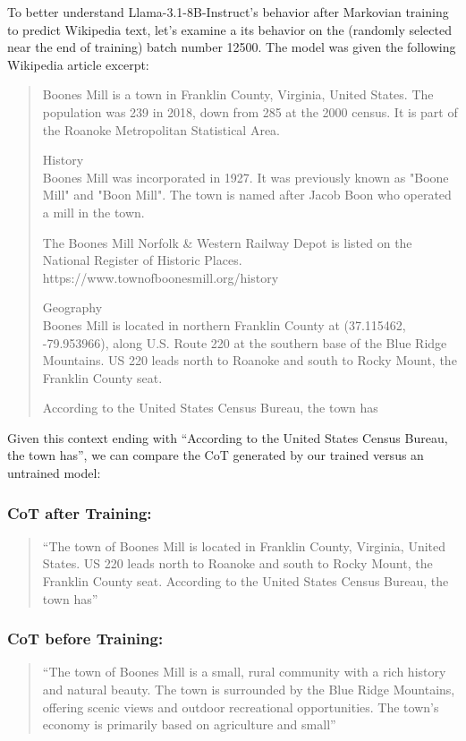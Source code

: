 \documentclass{article}
\begin{document}
To better understand Llama-3.1-8B-Instruct's behavior after Markovian training to predict Wikipedia text, let's examine a its behavior on the (randomly selected near the end of training) batch number 12500. The model was given the following Wikipedia article excerpt:

\begin{quote}
Boones Mill is a town in Franklin County, Virginia, United States. The population was 239 in 2018, down from 285 at the 2000 census. It is part of the Roanoke Metropolitan Statistical Area.

History\\
Boones Mill was incorporated in 1927. It was previously known as "Boone Mill" and "Boon Mill". The town is named after Jacob Boon who operated a mill in the town.

The Boones Mill Norfolk \& Western Railway Depot is listed on the National Register of Historic Places.
https://www.townofboonesmill.org/history

Geography\\
Boones Mill is located in northern Franklin County at  (37.115462, -79.953966), along U.S. Route 220 at the southern base of the Blue Ridge Mountains. US 220 leads north  to Roanoke and south  to Rocky Mount, the Franklin County seat.

According to the United States Census Bureau, the town has
\end{quote}

Given this context ending with ``According to the United States Census Bureau, the town has'', we can compare the CoT generated by our trained versus an untrained model:

\subsubsection{CoT after Training:}
\begin{quote}
``The town of Boones Mill is located in Franklin County, Virginia, United States. US 220 leads north to Roanoke and south to Rocky Mount, the Franklin County seat. According to the United States Census Bureau, the town has''
\end{quote}

\subsubsection{CoT before Training:}
\begin{quote}
``The town of Boones Mill is a small, rural community with a rich history and natural beauty. The town is surrounded by the Blue Ridge Mountains, offering scenic views and outdoor recreational opportunities. The town's economy is primarily based on agriculture and small''
\end{quote}
\end{document}
